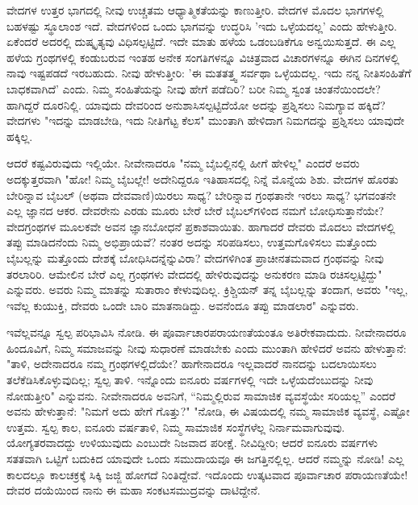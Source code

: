 ವೇದಗಳ ಉತ್ತರ ಭಾಗದಲ್ಲಿ ನೀವು ಉಚ್ಚತಮ ಆಧ್ಯಾತ್ಮಿಕತೆಯನ್ನು ಕಾಣುತ್ತೀರಿ. ವೇದಗಳ ಮೊದಲ ಭಾಗಗಳಲ್ಲಿ ಬಹಳಷ್ಟು ಸ್ಥೂಲಾಂಶ ಇದೆ. ವೇದಗಳಿಂದ ಒಂದು ಭಾಗವನ್ನು ಉದ್ಧರಿಸಿ 'ಇದು ಒಳ್ಳೆಯದಲ್ಲ' ಎಂದು ಹೇಳುತ್ತೀರಿ. ಏಕೆಂದರೆ ಅದರಲ್ಲಿ ದುಷ್ಕೃತ್ಯವು ವಿಧಿಸಲ್ಪಟ್ಟಿದೆ. ಇದೇ ಮಾತು ಹಳೆಯ ಒಡಂಬಡಿಕೆಗೂ ಅನ್ವಯಿಸುತ್ತದೆ. ಈ ಎಲ್ಲ ಹಳೆಯ ಗ್ರಂಥಗಳಲ್ಲಿ ಕಂಡುಬರುವ ಇಂತಹ ಅನೇಕ ಸಂಗತಿಗಳನ್ನೂ ವಿಚಿತ್ರವಾದ ವಿಚಾರಗಳನ್ನೂ ಈಗಿನ ದಿನಗಳಲ್ಲಿ ನಾವು ಇಷ್ಟಪಡದೆ ಇರಬಹುದು. ನೀವು ಹೇಳುತ್ತೀರಿ: 'ಈ ಮತತತ್ತ್ವ ಸರ್ವಥಾ ಒಳ್ಳೆಯದಲ್ಲ. ಇದು ನನ್ನ ನೀತಿಸಂಹಿತೆಗೆ ಬಾಧಕವಾಗಿದೆ' ಎಂದು. ನಿಮ್ಮ ಸಂಹಿತೆಯನ್ನು ನೀವು ಹೇಗೆ ಪಡೆದಿರಿ? ಬರೀ ನಿಮ್ಮ ಸ್ವಂತ ಚಿಂತನೆಯಿಂದಲೇ? ಹಾಗಿದ್ದರೆ ದೂರನಿಲ್ಲಿ. ಯಾವುದು ದೇವರಿಂದ ಅನುಶಾಸಿಸಲ್ಪಟ್ಟಿದೆಯೋ ಅದನ್ನು ಪ್ರಶ್ನಿಸಲು ನಿಮಗ್ಯಾವ ಹಕ್ಕಿದೆ? ವೇದಗಳು "ಇದನ್ನು ಮಾಡಬೇಡಿ, ಇದು ನೀತಿಗೆಟ್ಟ ಕೆಲಸ" ಮುಂತಾಗಿ ಹೇಳಿದಾಗ ನಿಮಗದನ್ನು ಪ್ರಶ್ನಿಸಲು ಯಾವುದೇ ಹಕ್ಕಿಲ್ಲ.

ಆದರೆ ಕಷ್ಟವಿರುವುದು ಇಲ್ಲಿಯೇ. ನೀವೇನಾದರೂ "ನಮ್ಮ ಬೈಬಲ್ಲಿನಲ್ಲಿ ಹೀಗೆ ಹೇಳಿಲ್ಲ" ಎಂದರೆ ಅವರು ಅದಕ್ಕುತ್ತರವಾಗಿ "ಹೋ! ನಿಮ್ಮ ಬೈಬಲ್ಲೇ! ಅದೇನಿದ್ದರೂ ಇತಿಹಾಸದಲ್ಲಿ ನಿನ್ನೆ ಮೊನ್ನೆಯ ಶಿಶು. ವೇದಗಳ ಹೊರತು ಬೇರಿನ್ನಾವ ಬೈಬಲ್ (ಅಥವಾ ದೇವವಾಣಿ)ಯಿರಲು ಸಾಧ್ಯ? ಬೇರಿನ್ನಾವ ಗ್ರಂಥತಾನೇ ಇರಲು ಸಾಧ್ಯ? ಭಗವಂತನೇ ಎಲ್ಲ ಜ್ಞಾನದ ಆಕರ. ದೇವರೇನು ಎರಡು ಮೂರು ಬೇರೆ ಬೇರೆ ಬೈಬಲ್‌ಗಳಿಂದ ನಮಗೆ ಬೋಧಿಸುತ್ತಾನೆಯೇ? ವೇದಗ್ರಂಥಗಳ ಮೂಲಕವೇ ಅವನ ಜ್ಞಾನಬೋಧನೆ ಪ್ರಕಾಶವಾಯಿತು. ಹಾಗಾದರೆ ದೇವರು ಮೊದಲು ವೇದಗಳಲ್ಲಿ ತಪ್ಪು ಮಾಡಿದನೆಂದು ನಿಮ್ಮ ಅಭಿಪ್ರಾಯವೆ? ನಂತರ ಅದನ್ನು ಸರಿಪಡಿಸಲು, ಉತ್ತಮಗೊಳಿಸಲು ಮತ್ತೊಂದು ಬೈಬಲ್ಲನ್ನು ಮತ್ತೊಂದು ದೇಶಕ್ಕೆ ಬೋಧಿಸಿದನ್ನೆನ್ನುವಿರಾ? ವೇದಗಳಿಗಿಂತ ಪ್ರಾಚೀನತಮವಾದ ಗ್ರಂಥವನ್ನು ನೀವು ತರಲಾರಿರಿ. ಆಮೇಲಿನ ಬೇರೆ ಎಲ್ಲ ಗ್ರಂಥಗಳು ವೇದದಲ್ಲಿ ಹೇಳಿರುವುದನ್ನು ಅನುಕರಣ ಮಾಡಿ ರಚಿಸಲ್ಪಟ್ಟಿದ್ದು" ಎನ್ನುವರು. ಅವರು ನಿಮ್ಮ ಮಾತನ್ನು ಸುತಾರಾಂ ಕೇಳುವುದಿಲ್ಲ. ಕ್ರಿಶ್ಚಿಯನ್ ತನ್ನ ಬೈಬಲ್ಲನ್ನು ತಂದಾಗ, ಅವರು "ಇಲ್ಲ, ಇವೆಲ್ಲ ಕುಯುಕ್ತಿ, ದೇವರು ಒಂದೇ ಬಾರಿ ಮಾತನಾಡಿದ್ದು. ಅವನೆಂದೂ ತಪ್ಪು ಮಾಡಲಾರ" ಎನ್ನುವರು.

ಇವೆಲ್ಲವನ್ನೂ ಸ್ವಲ್ಪ ಪರಿಭಾವಿಸಿ ನೋಡಿ. ಈ ಪೂರ್ವಾಚಾರಪರಾಯಣತೆಯಂತೂ ಅತಿರೇಕವಾದುದು. ನೀವೇನಾದರೂ ಹಿಂದೂವಿಗೆ, ನಿಮ್ಮ ಸಮಾಜವನ್ನು ನೀವು ಸುಧಾರಣೆ ಮಾಡಬೇಕು ಎಂದು ಮುಂತಾಗಿ ಹೇಳಿದರೆ ಅವನು ಹೇಳುತ್ತಾನೆ: "ತಾಳಿ, ಅದೇನಾದರೂ ನಮ್ಮ ಗ್ರಂಥಗಳಲ್ಲಿದೆಯೇ? ಹಾಗೇನಾದರೂ ಇಲ್ಲವಾದರೆ ನಾನದನ್ನು ಬದಲಾಯಿಸಲು ತಲೆಕೆಡಿಸಿಕೊಳ್ಳುವುದಿಲ್ಲ; ಸ್ವಲ್ಪ ತಾಳಿ. ಇನ್ನೊಂದು ಐನೂರು ವರ್ಷಗಳಲ್ಲಿ ಇದೇ ಒಳ್ಳೆಯದೆಂಬುದನ್ನು ನೀವು ನೋಡುತ್ತೀರಿ" ಎನ್ನುವನು. ನೀವೇನಾದರೂ ಅವನಿಗೆ, “ನಿಮ್ಮಲ್ಲಿರುವ ಸಾಮಾಜಿಕ ವ್ಯವಸ್ಥೆಯೇ ಸರಿಯಲ್ಲ” ಎಂದರೆ ಅವನು ಹೇಳುತ್ತಾನೆ: "ನಿಮಗೆ ಅದು ಹೇಗೆ ಗೊತ್ತು?" "ನೋಡಿ, ಈ ವಿಷಯದಲ್ಲಿ ನಮ್ಮ ಸಾಮಾಜಿಕ ವ್ಯವಸ್ಥೆ, ಎಷ್ಟೋ ಉತ್ತಮ. ಸ್ವಲ್ಪ ಕಾಲ, ಐನೂರು ವರ್ಷತಾಳಿ, ನಿಮ್ಮ ಸಾಮಾಜಿಕ ಸಂಸ್ಥೆಗಳೆಲ್ಲ ನಿರ್ನಾಮವಾಗುವುವು. ಯೋಗ್ಯತರವಾದದ್ದು ಉಳಿಯುವುದು ಎಂಬುದೇ ನಿಜವಾದ ಪರೀಕ್ಷೆ. ನೀವಿದ್ದೀರಿ; ಆದರೆ ಐನೂರು ವರ್ಷಗಳು ಸತತವಾಗಿ ಒಟ್ಟಿಗೆ ಬದುಕಿದ ಯಾವುದೇ ಒಂದು ಸಮುದಾಯವೂ ಈ ಜಗತ್ತಿನಲ್ಲಿಲ್ಲ. ಆದರೆ ನಮ್ಮನ್ನು ನೋಡಿ! ಎಲ್ಲ ಕಾಲದಲ್ಲೂ ಕಾಲಚಕ್ರಕ್ಕೆ ಸಿಕ್ಕಿ ಜಜ್ಜಿ ಹೋಗದೆ ನಿಂತಿದ್ದೇವೆ. ಇದೊಂದು ಉತ್ಕಟವಾದ ಪೂರ್ವಾಚಾರ ಪರಾಯಣತೆಯೇ! ದೇವರ ದಯೆಯಿಂದ ನಾನು ಈ ಮಹಾ ಸಂಕಟಸಮುದ್ರವನ್ನು ದಾಟಿದ್ದೇನೆ.

